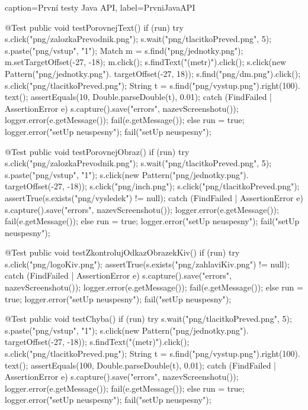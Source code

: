\documentclass{bakalarka}
\begin{document}
\begin{lstjava}{caption={První testy Java API}, label={PrvniJavaAPI}}
{  @Test
  public void testPorovnejText() {
    if (run) {
      try {
        s.click("png/zalozkaPrevodnik.png");
        s.wait("png/tlacitkoPreved.png", 5);
        s.paste("png/vstup", "1");
        Match m = s.find("png/jednotky.png");
        m.setTargetOffset(-27, -18);
        m.click();
        s.findText("(metr)").click();
        s.click(new Pattern("png/jednotky.png").
          targetOffset(-27, 18));
        s.find("png/dm.png").click();
        s.click("png/tlacitkoPreved.png");
        String t = s.find("png/vystup.png").right(100).
          text();
        assertEquals(10, Double.parseDouble(t), 0.01);
      } catch (FindFailed | AssertionError e) {
        s.capture().save("errors", nazevScreenshotu());
        logger.error(e.getMessage());
        fail(e.getMessage());
      }
    } else {
      run = true;
      logger.error("setUp neuspesny");
      fail("setUp neuspesny");
    }
  }

  @Test
  public void testPorovnejObraz() {
    if (run) {
      try {
        s.click("png/zalozkaPrevodnik.png");
        s.wait("png/tlacitkoPreved.png", 5);
        s.paste("png/vstup", "1");
        s.click(new Pattern("png/jednotky.png").
          targetOffset(-27, -18));
        s.click("png/inch.png");
        s.click("png/tlacitkoPreved.png");
        assertTrue(s.exists("png/vysledek") != null);
      } catch (FindFailed | AssertionError e) {
        s.capture().save("errors", nazevScreenshotu());
        logger.error(e.getMessage());
        fail(e.getMessage());
      }
    } else {
      run = true;
      logger.error("setUp neuspesny");
      fail("setUp neuspesny");
    }
  }

  @Test
  public void testZkontrolujOdkazObrazekKiv() {
    if (run) {
      try {
        s.click("png/logoKiv.png");
        assertTrue(s.exists("png/zahlaviKiv.png") !=
          null);
      } catch (FindFailed | AssertionError e) {
        s.capture().save("errors", nazevScreenshotu());
        logger.error(e.getMessage());
        fail(e.getMessage());
      }
    } else {
      run = true;
      logger.error("setUp neuspesny");
      fail("setUp neuspesny");
    }
  }

  @Test
  public void testChyba() {
    if (run) {
      try {
        s.wait("png/tlacitkoPreved.png", 5);
        s.paste("png/vstup", "1");
        s.click(new Pattern("png/jednotky.png").
          targetOffset(-27, -18));
        s.findText("(metr)").click();
        s.click("png/tlacitkoPreved.png");
        String t = s.find("png/vystup.png").right(100).
          text();
        assertEquals(100, Double.parseDouble(t), 0.01);
      } catch (FindFailed | AssertionError e) {
        s.capture().save("errors", nazevScreenshotu());
        logger.error(e.getMessage());
        fail(e.getMessage());
      }
    } else {
      run = true;
      logger.error("setUp neuspesny");
      fail("setUp neuspesny");
    }
  }
}
		\end{lstjava}
		
\end{document}

